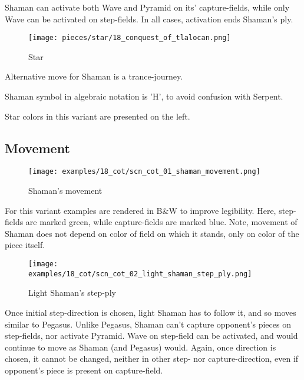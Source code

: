 Shaman can activate both Wave and Pyramid on its' capture-fields, while only
Wave can be activated on step-fields. In all cases, activation ends Shaman's
ply.

\noindent
\begin{wrapfigure}{l}{0.4\textwidth}
\centering
\texttt{[image: pieces/star/18\_conquest\_of\_tlalocan.png]}
\caption{Star}
\label{fig:star/18_conquest_of_tlalocan}
\end{wrapfigure}
Alternative move for Shaman is a trance-journey.

Shaman symbol in algebraic notation is 'H', to avoid confusion with Serpent.

Star colors in this variant are presented on the left.

\clearpage %

\subsection*{Movement}

\noindent
\begin{figure}[!h]
\texttt{[image: examples/18\_cot/scn\_cot\_01\_shaman\_movement.png]}
\caption{Shaman's movement}
\label{fig:scn_cot_01_shaman_movement}
\end{figure}

For this variant examples are rendered in B\&W to improve legibility.
Here, step-fields are marked green, while capture-fields are marked blue.
Note, movement of Shaman does not depend on color of field on which it
stands, only on color of the piece itself.

\clearpage %

\noindent
\begin{figure}[!h]
\texttt{[image: examples/18\_cot/scn\_cot\_02\_light\_shaman\_step\_ply.png]}
\caption{Light Shaman's step-ply}
\label{fig:scn_cot_02_light_shaman_step_ply}
\end{figure}

Once initial step-direction is chosen, light Shaman has to follow it,
and so moves similar to Pegasus. Unlike Pegasus, Shaman can't capture
opponent's pieces on step-fields, nor activate Pyramid. Wave on step-field
can be activated, and would continue to move as Shaman (and Pegasus)
would. Again, once direction is chosen, it cannot be changed, neither
in other step- nor capture-direction, even if opponent's piece is present
on capture-field.

